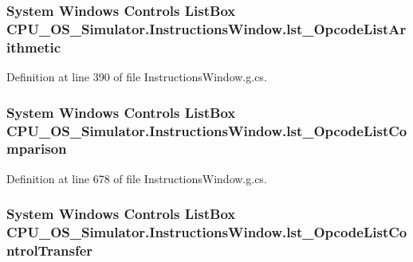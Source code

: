 \subsubsection[{lst\+\_\+\+Opcode\+List\+Arithmetic}]{\setlength{\rightskip}{0pt plus 5cm}System Windows Controls List\+Box C\+P\+U\+\_\+\+O\+S\+\_\+\+Simulator.\+Instructions\+Window.\+lst\+\_\+\+Opcode\+List\+Arithmetic\hspace{0.3cm}{\ttfamily [package]}}\label{class_c_p_u___o_s___simulator_1_1_instructions_window_a7445b276d3723f67ba564038940d44c5}


Definition at line 390 of file Instructions\+Window.\+g.\+cs.

\hypertarget{class_c_p_u___o_s___simulator_1_1_instructions_window_ae47949fa5657e55f8acd8e5b9cd204c0}{}
\subsubsection[{lst\+\_\+\+Opcode\+List\+Comparison}]{\setlength{\rightskip}{0pt plus 5cm}System Windows Controls List\+Box C\+P\+U\+\_\+\+O\+S\+\_\+\+Simulator.\+Instructions\+Window.\+lst\+\_\+\+Opcode\+List\+Comparison\hspace{0.3cm}{\ttfamily [package]}}\label{class_c_p_u___o_s___simulator_1_1_instructions_window_ae47949fa5657e55f8acd8e5b9cd204c0}


Definition at line 678 of file Instructions\+Window.\+g.\+cs.

\hypertarget{class_c_p_u___o_s___simulator_1_1_instructions_window_a111f1ddd903fe40e0c83efeca42bdf51}{}
\subsubsection[{lst\+\_\+\+Opcode\+List\+Control\+Transfer}]{\setlength{\rightskip}{0pt plus 5cm}System Windows Controls List\+Box C\+P\+U\+\_\+\+O\+S\+\_\+\+Simulator.\+Instructions\+Window.\+lst\+\_\+\+Opcode\+List\+Control\+Transfer\hspace{0.3cm}{\ttfamily [package]}}\label{class_c_p_u___o_s___simulator_1_1_instructions_window_a111f1ddd903fe40e0c83efeca42bdf51}


